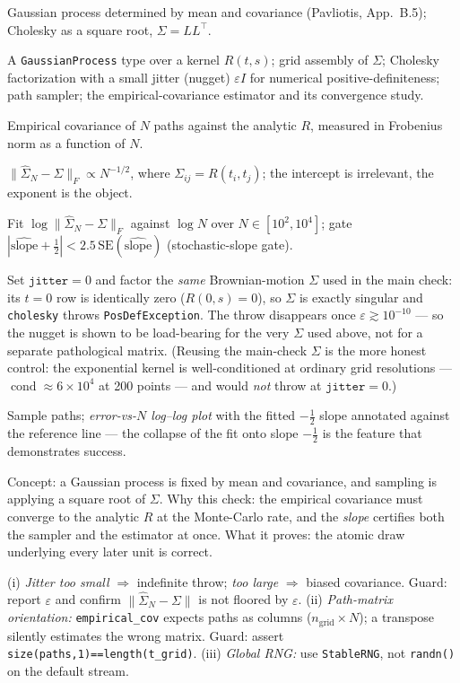 \documentclass[11pt]{article}
\newcommand{\pav}[1]{{\small\color{hubblue}(Pavliotis, #1)}}
\newenvironment{unitmeta}{%
  \begin{description}[style=sameline,leftmargin=1.4cm,font=\bfseries\color{hubblue}]
}{%
  \end{description}
}
\begin{document}
\begin{unitmeta}
\item[Concept] Gaussian process determined by mean and covariance \pav{App.~B.5}; Cholesky as a square root, $\Sigma = LL^\top$.
\item[Build] A \texttt{GaussianProcess} type over a kernel $R(t,s)$; grid assembly of $\Sigma$; Cholesky factorization with a small jitter (nugget) $\varepsilon I$ for numerical positive-definiteness; path sampler; the empirical-covariance estimator and its convergence study.
\item[Check] Empirical covariance of $N$ paths against the analytic $R$, measured in Frobenius norm as a function of $N$.
\item[Analytic target] $\|\widehat\Sigma_N - \Sigma\|_F \propto N^{-1/2}$, where $\Sigma_{ij}=R(t_i,t_j)$; the intercept is irrelevant, the exponent is the object.
\item[Pass/fail] Fit $\log\|\widehat\Sigma_N-\Sigma\|_F$ against $\log N$ over $N\in[10^2,10^4]$; gate $|\widehat{\text{slope}}+\tfrac12| < 2.5\,\mathrm{SE}(\widehat{\text{slope}})$ (stochastic-slope gate).
\item[Negative control] Set $\texttt{jitter}=0$ and factor the \emph{same} Brownian-motion $\Sigma$ used in the main check: its $t=0$ row is identically zero ($R(0,s)=0$), so $\Sigma$ is exactly singular and \texttt{cholesky} throws \texttt{PosDefException}. The throw disappears once $\varepsilon\gtrsim10^{-10}$ --- so the nugget is shown to be load-bearing for the very $\Sigma$ used above, not for a separate pathological matrix. (Reusing the main-check $\Sigma$ is the more honest control: the exponential kernel is well-conditioned at ordinary grid resolutions --- $\operatorname{cond}\approx6\times10^4$ at 200 points --- and would \emph{not} throw at $\texttt{jitter}=0$.)
\item[Artifact] Sample paths; \emph{error-vs-$N$ log--log plot} with the fitted $-\tfrac12$ slope annotated against the reference line --- the collapse of the fit onto slope $-\tfrac12$ is the feature that demonstrates success.
\item[README] Concept: a Gaussian process is fixed by mean and covariance, and sampling is applying a square root of $\Sigma$. Why this check: the empirical covariance must converge to the analytic $R$ at the Monte-Carlo rate, and the \emph{slope} certifies both the sampler and the estimator at once. What it proves: the atomic draw underlying every later unit is correct.
\item[Missteps] (i) \emph{Jitter too small} $\Rightarrow$ indefinite throw; \emph{too large} $\Rightarrow$ biased covariance. Guard: report $\varepsilon$ and confirm $\|\widehat\Sigma_N-\Sigma\|$ is not floored by $\varepsilon$. (ii) \emph{Path-matrix orientation:} \texttt{empirical\_cov} expects paths as columns ($n_{\text{grid}}\times N$); a transpose silently estimates the wrong matrix. Guard: assert \texttt{size(paths,1)==length(t\_grid)}. (iii) \emph{Global RNG:} use \texttt{StableRNG}, not \texttt{randn()} on the default stream.

\end{unitmeta}
\end{document}
